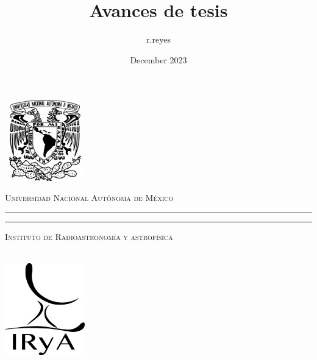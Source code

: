 \documentclass{book}
\title{Avances de tesis}
\author{r.reyes }
\date{December 2023}
\begin{document}
    \begin{titlepage}
        \thispagestyle{empty}
        \begin{minipage}[c][0.17\textheight][c]{0.25\textwidth}
            \begin{center}
                \includegraphics[width=3.5cm, height=3.5cm]{Escudo-UNAM.pdf}
            \end{center}
        \end{minipage}
        \begin{minipage}[c][0.195\textheight][t]{0.75\textwidth}
            \begin{center}
                \vspace{0.3cm}
                \textsc{\large Universidad Nacional Aut\'onoma de M\'exico}\\[0.5cm]
                \vspace{0.3cm}
                \hrule height2.5pt
                \vspace{.2cm}
                \hrule height1pt
                \vspace{.8cm}
                \textsc{Instituto de Radioastronomía y astrofísica}\\[0.5cm] %
            \end{center}
        \end{minipage}

        \begin{minipage}[c][0.81\textheight][t]{0.25\textwidth}
            \vspace*{5mm}
            \begin{center}
                \hskip2.0mm
                \vrule width1pt height13cm 
                \vspace{5mm}
                \hskip2pt
                \vrule width2.5pt height13cm
                \hskip2mm
                \vrule width1pt height13cm \\
                \vspace{5mm}
                \includegraphics[height=4.0cm]{logoIRyAnegro_1.png}
            \end{center}
        \end{minipage}
        \begin{minipage}[c][0.81\textheight][t]{0.75\textwidth}
            \begin{center}
                \vspace{1cm}


\end{center}
\end{minipage}
\end{titlepage}
\end{document}
